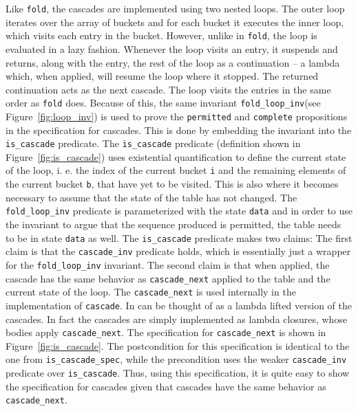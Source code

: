 \documentclass[10pt,a4paper]{article}
\begin{document}
Like \texttt{fold}, the cascades are implemented using two nested loops. The outer loop iterates over the array of buckets and for each bucket it executes the inner loop, which visits each entry in the bucket. However, unlike in \texttt{fold}, the loop is evaluated in a lazy fashion. Whenever the loop visits an entry, it suspends and returns, along with the entry, the rest of the loop as a continuation -- a lambda which, when applied, will resume the loop where it stopped. The returned continuation acts as the next cascade. The loop visits the entries in the same order as \texttt{fold} does. Because of this, the same invariant \texttt{fold\_loop\_inv}(see Figure~\ref{fig:loop_inv}) is used to prove the \texttt{permitted} and \texttt{complete} propositions in the specification for cascades. This is done by embedding the invariant into the \texttt{is\_cascade} predicate. The \texttt{is\_cascade} predicate (definition shown in Figure~\ref{fig:is_cascade}) uses existential quantification to define the current state of the loop, i. e. the index of the current bucket \texttt{i} and the remaining elements of the current bucket \texttt{b}, that have yet to be visited. This is also where it becomes necessary to assume that the state of the table has not changed. The \texttt{fold\_loop\_inv} predicate is parameterized with the state \texttt{data} and in order to use the invariant to argue that the sequence produced is permitted, the table needs to be in state \texttt{data} as well. The \texttt{is\_cascade} predicate makes two claims: The first claim is that the \texttt{cascade\_inv} predicate holds, which is essentially just a wrapper for the \texttt{fold\_loop\_inv} invariant. The second claim is that when applied, the cascade has the same behavior as \texttt{cascade\_next} applied to the table and the current state of the loop. The \texttt{cascade\_next} is used internally in the implementation of \texttt{cascade}. In can be thought of as a lambda lifted version of the cascades. In fact the cascades are simply implemented as lambda closures, whose bodies apply \texttt{cascade\_next}. The specification for \texttt{cascade\_next} is shown in Figure~\ref{fig:is_cascade}. The postcondition for this specification is identical to the one from \texttt{is\_cascade\_spec}, while the precondition uses the weaker \texttt{cascade\_inv} predicate over \texttt{is\_cascade}. Thus, using this specification, it is quite easy to show the specification for cascades given that cascades have the same behavior as \texttt{cascade\_next}.
\end{document}

